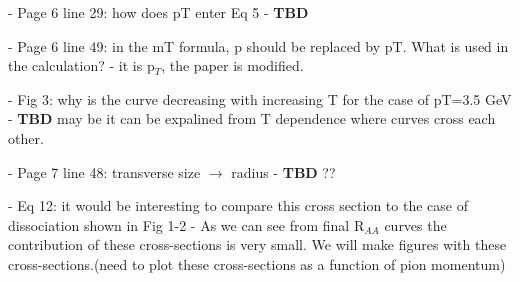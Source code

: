 \documentclass[a4paper,11pt]{article}
\begin{document}
- Page 6 line 29: how does pT enter Eq 5 \newline
- {\color{red} \textbf{TBD}}\newline

- Page 6 line 49: in the mT formula, p should be replaced by pT. What is used in the calculation? \newline
- {\color{blue} it is p$_{T}$, the paper is modified.}\newline

- Fig 3: why is the curve decreasing with increasing T for the case of pT=3.5 GeV \newline
- {\color{red} \textbf{TBD} may be it can be expalined from T dependence where curves cross each other.}\newline

- Page 7 line 48: transverse size $\rightarrow$ radius \newline
- {\color{red} \textbf{TBD} ??}\newline

- Eq 12: it would be interesting to compare this cross section to the case of dissociation shown in Fig 1-2 \newline
- {\color{blue} As we can see from final R$_{AA}$ curves the contribution of these cross-sections is very small. We will make
  figures with these cross-sections.(need to plot these cross-sections as a function of pion momentum)}\newline
\end{document}
